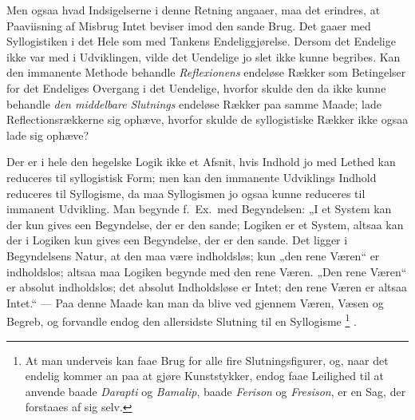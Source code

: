 \documentclass[12pt]{book}
\newcommand{\opage}[1]{\marginnote{\footnotesize\textit{[#1]}}}
\begin{document}
Men ogsaa hvad Indsigelserne i denne Retning angaaer,
\opage{327}maa det erindres, at Paaviisning af Misbrug Intet beviser imod den sande Brug. Det gaaer med Syllogistiken i det Hele som med Tankens Endeliggjørelse. Dersom det Endelige ikke var med i Udviklingen, vilde det Uendelige jo slet ikke kunne begribes. Kan den immanente Methode behandle \emph{Reflexionens} endeløse Rækker som Betingelser for det Endeliges Overgang i det Uendelige, hvorfor skulde den da ikke kunne behandle \emph{den middelbare Slutnings} endeløse Rækker paa samme Maade; lade Reflectionsrækkerne sig ophæve, hvorfor skulde de syllogistiske Rækker ikke ogsaa lade sig ophæve?

Der er i hele den hegelske Logik ikke et Afsnit, hvis Indhold jo med Lethed kan reduceres til syllogistisk Form; men kan den immanente Udviklings Indhold reduceres til Syllogisme, da maa Syllogismen jo ogsaa kunne reduceres til immanent Udvikling. Man begynde f.\ Ex.\ med Begyndelsen: „I et System kan der kun gives een Begyndelse, der er den sande; Logiken er et System, altsaa kan der i Logiken kun gives een Begyndelse, der er den sande. Det ligger i Begyndelsens Natur, at den maa være indholdsløs; kun „den rene Væren“ er indholdslos; altsaa maa Logiken begynde med den rene Væren. „Den rene Væren“ er absolut indholdslos; det absolut Indholdsløse er Intet; den rene Væren er altsaa Intet.“ --- Paa denne Maade kan man da blive ved gjennem Væren, Væsen og Begreb, og forvandle endog den allersidste Slutning til en Syllogisme%
\footnote{At man underveis kan faae Brug for alle fire Slutningsfigurer, og, naar det endelig kommer an paa at gjøre Kunststykker, endog faae Leilighed til at anvende baade \textit{Darapti} og \textit{Bamalip}, baade \textit{Ferison} og \textit{Fresison}, er en Sag, der forstaaes af sig selv.}%
.
\end{document}
